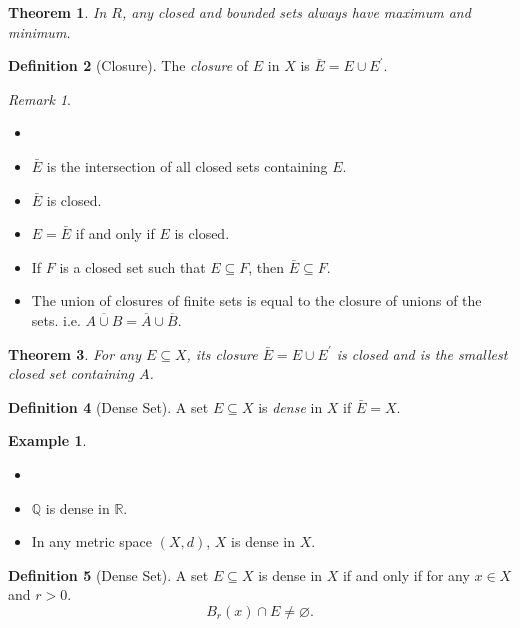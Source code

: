 \documentclass[12pt, lettersize]{book}
\theoremstyle{plain}
\newtheorem{thm}{Theorem}[section]
\theoremstyle{definition}
\newtheorem{dfn}[thm]{Definition}
\newtheorem*{eg}{Example}
\theoremstyle{remark}
\newtheorem*{rem}{Remark}
\newcommand{\R}{\mathbb{R}}
\newcommand{\Q}{\mathbb{Q}}
\let\emptyset\varnothing
\begin{document}
	\begin{thm}
		In $R$, any closed and bounded sets always have maximum and minimum.
	\end{thm}
	
	\begin{dfn}[Closure]
		The \emph{closure} of $E$ in $X$ is $\bar{E}=E\cup E^\prime$.
	\end{dfn}
	\begin{rem}
		\begin{itemize}
			\item[]
			\item $\bar{E}$ is the intersection of all closed sets containing $E$.
			\item $\bar{E}$ is closed.
			\item $E=\bar{E}$ if and only if $E$ is closed.
			\item If $F$ is a closed set such that $E\subseteq F$, then $\bar{E}\subseteq F$.
			\item The union of closures of finite sets is equal to the closure of unions of the sets. i.e. $\overline{A\cup B}=\overline{A}\cup\overline{B}$.
		\end{itemize}
	\end{rem}
	
	\begin{thm}
		For any $E\subseteq X$, its closure $\bar{E}=E\cup E^\prime$ is closed and is the smallest closed set containing $A$.
	\end{thm}
	
	\begin{dfn}[Dense Set]
		A set $E\subseteq X$ is \emph{dense} in $X$ if $\bar{E}=X$.
	\end{dfn}
	\begin{eg}
		\begin{itemize}
			\item[]
			\item $\Q$ is dense in $\R$.
			\item In any metric space $(X,d)$, $X$ is dense in $X$. 
		\end{itemize}
	\end{eg}
	
	\begin{dfn}[Dense Set]
		A set $E\subseteq X$ is dense in $X$ if and only if for any $x\in X$ and $r>0$.
		\begin{displaymath}
			B_r(x)\cap E\neq\emptyset.
		\end{displaymath} 
	\end{dfn}
	
\end{document}
